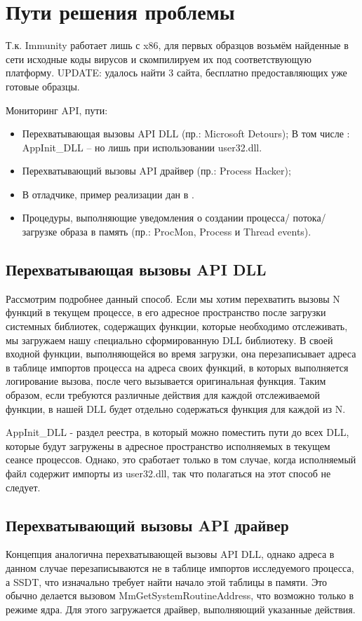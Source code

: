 \section {Пути решения проблемы}
Т.к. Immunity работает лишь с x86, для первых образцов возьмём найденные в сети
исходные коды вирусов и скомпилируем их под соответствующую платформу.
UPDATE: удалось найти 3 сайта, бесплатно предоставляющих уже готовые образцы.

Мониторинг API, пути:
\begin {itemize}
	\item Перехватывающая вызовы API DLL (пр.: Microsoft Detours);
	В том числе : AppInit\_DLL – но лишь при использовании user32.dll.
	\item Перехватывающий вызовы API драйвер (пр.: Process Hacker);
	\item В отладчике, пример реализации дан в \cite{MALWAREBOOK}.
	\item Процедуры, выполняющие уведомления о создании процесса/ потока/ загрузке образа в память (пр.:
 	ProcMon, Process и Thread events).
\end {itemize}

\subsection {Перехватывающая вызовы API DLL}
Рассмотрим подробнее данный способ. Если мы хотим перехватить вызовы N функций в текущем процессе,
 в его адресное пространство после загрузки системных библиотек, содержащих функции, которые необходимо
 отслеживать, мы загружаем нашу cпециально сформированную DLL библиотеку. В своей входной функции,
 выполняющейся во время загрузки, она перезаписывает адреса в таблице импортов процесса на адреса своих
 функций, в которых выполняется логирование вызова, после чего вызывается оригинальная функция. Таким образом, если требуются различные действия для каждой отслеживаемой функции, в нашей DLL будет отдельно
 содержаться функция для каждой из N.
 
 AppInit\_DLL - раздел реестра, в который можно поместить пути до всех DLL, которые будут загружены в адресное
 пространство исполняемых в текущем сеансе процессов. Однако, это сработает только в том случае, когда исполняемый файл содержит импорты из user32.dll, так что полагаться на этот способ не следует.
\subsection {Перехватывающий вызовы API драйвер}
 Концепция аналогична перехватывающей вызовы API DLL, однако адреса в данном случае перезаписываются не в
 таблице импортов исследуемого процесса, а SSDT, что изначально требует найти начало этой таблицы в памяти. Это обычно делается вызовом MmGetSystemRoutineAddress, что возможно только в режиме ядра. Для этого загружается драйвер, выполняющий указанные действия.
